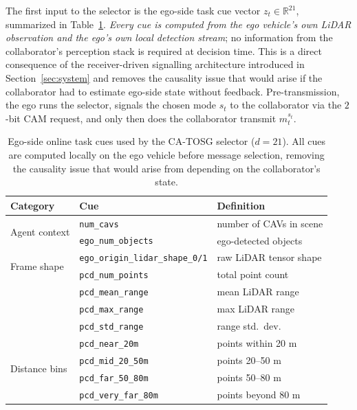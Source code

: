 \documentclass[journal]{IEEEtran}
\newcommand{\method}{CA-TOSG}
\begin{document}
The first input to the selector is the ego-side task cue vector $z_t \in \mathbb{R}^{21}$, summarized in Table~\ref{tab:cues}. \emph{Every cue is computed from the ego vehicle's own LiDAR observation and the ego's own local detection stream}; no information from the collaborator's perception stack is required at decision time. This is a direct consequence of the receiver-driven signalling architecture introduced in Section~\ref{sec:system} and removes the causality issue that would arise if the collaborator had to estimate ego-side state without feedback. Pre-transmission, the ego runs the selector, signals the chosen mode $s_t$ to the collaborator via the $2$-bit CAM request, and only then does the collaborator transmit $m_t^{s_t}$.

\begin{table}[t]
\centering
\caption{Ego-side online task cues used by the \method{} selector ($d=21$). All cues are computed locally on the ego vehicle before message selection, removing the causality issue that would arise from depending on the collaborator's state.}
\label{tab:cues}
\begin{tabular}{lll}
\toprule
Category & Cue & Definition \\
\midrule
\multirow{2}{*}{Agent context} & \texttt{num\_cavs} & number of CAVs in scene \\
                               & \texttt{ego\_num\_objects} & ego-detected objects \\
\midrule
\multirow{2}{*}{Frame shape}   & \texttt{ego\_origin\_lidar\_shape\_0/1} & raw LiDAR tensor shape \\
\midrule
\multirow{4}{*}{Range stats}   & \texttt{pcd\_num\_points} & total point count \\
                               & \texttt{pcd\_mean\_range}    & mean LiDAR range \\
                               & \texttt{pcd\_max\_range}     & max LiDAR range \\
                               & \texttt{pcd\_std\_range}     & range std.\ dev. \\
\midrule
\multirow{4}{*}{Distance bins} & \texttt{pcd\_near\_20m}      & points within 20 m \\
                               & \texttt{pcd\_mid\_20\_50m}   & points 20--50 m \\
                               & \texttt{pcd\_far\_50\_80m}   & points 50--80 m \\
                               & \texttt{pcd\_very\_far\_80m} & points beyond 80 m \\

\end{tabular}
\end{table}
\end{document}
